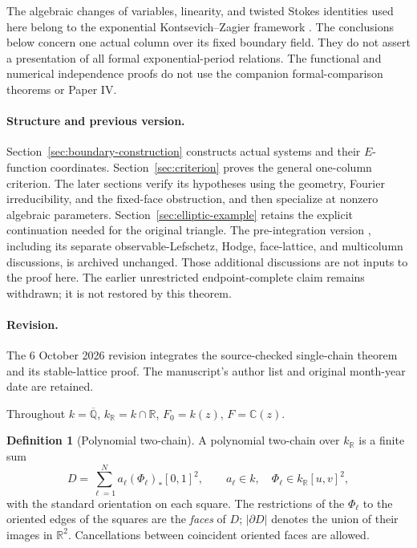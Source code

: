 \documentclass[11pt]{article}
\numberwithin{equation}{section}
\theoremstyle{definition}
\newtheorem{definition}[definition]{Definition}
\theoremstyle{remark}
\newcommand{\C}{\mathbb C}
\newcommand{\Qbar}{\overline{\mathbb Q}}
\newcommand{\R}{\mathbb R}
\begin{document}
The algebraic changes of variables, linearity, and twisted Stokes identities
used here belong to the exponential Kontsevich--Zagier framework
\cite{KontsevichZagier,CommelinHabeggerHuber}. The conclusions below concern
one actual column over its fixed boundary field. They do not assert a
presentation of all formal exponential-period relations. The functional and
numerical independence proofs do not use the companion formal-comparison
theorems or Paper IV.

\paragraph{Structure and previous version.}
Section~\ref{sec:boundary-construction} constructs actual systems and their
$E$-function coordinates. Section~\ref{sec:criterion} proves the general
one-column criterion. The later sections verify its hypotheses using the
geometry, Fourier irreducibility, and the fixed-face obstruction, and then
specialize at nonzero algebraic parameters. Section~\ref{sec:elliptic-example}
retains the explicit continuation needed for the original triangle.
The pre-integration version \cite{PaperVPrevious}, including its separate
observable-Lefschetz, Hodge, face-lattice, and multicolumn discussions, is
archived unchanged. Those additional discussions are not inputs to the
proof here. The earlier unrestricted endpoint-complete claim remains
withdrawn; it is not restored by this theorem.

\paragraph{Revision.} The 6 October 2026 revision integrates the
source-checked single-chain theorem and its stable-lattice proof. The
manuscript's author list and original month-year date are retained.



Throughout $k=\Qbar$, $k_\R=k\cap\R$, $F_0=k(z)$, $F=\C(z)$.

\begin{definition}[Polynomial two-chain]\label{def:polynomial-chain}
A polynomial two-chain over $k_\R$ is a finite sum
\[
 D=\sum_{\ell=1}^N a_\ell(\Phi_\ell)_*[0,1]^2,
 \qquad a_\ell\in k,\quad
 \Phi_\ell\in k_\R[u,v]^2,
\]
with the standard orientation on each square.  The restrictions of the
$\Phi_\ell$ to the oriented edges of the squares are the \emph{faces} of
$D$; $|\partial D|$ denotes the union of their images in $\R^2$.
Cancellations between coincident oriented faces are allowed.
\end{definition}
\end{document}
